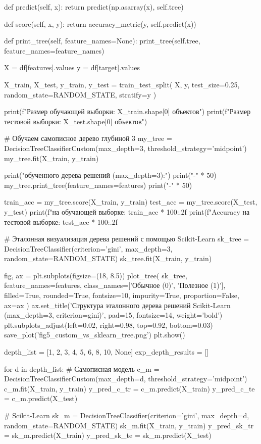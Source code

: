 \documentclass[14pt,a4paper]{extarticle}
\begin{document}
\begin{CodeListing}
    def predict(self, x):
        return predict(np.asarray(x), self.tree)

    def score(self, x, y):
        return accuracy_metric(y, self.predict(x))

    def print_tree(self, feature_names=None):
        print_tree(self.tree, feature_names=feature_names)

X = df[features].values
y = df[target].values

X_train, X_test, y_train, y_test = train_test_split(
    X, y, test_size=0.25, random_state=RANDOM_STATE, stratify=y
)

print(f"Размер обучающей выборки: {X_train.shape[0]} объектов")
print(f"Размер тестовой выборки:  {X_test.shape[0]} объектов")

# Обучаем самописное дерево глубиной 3
my_tree = DecisionTreeClassifierCustom(max_depth=3, threshold_strategy='midpoint')
my_tree.fit(X_train, y_train)

print(" обученного дерева решений (max_depth=3):")
print("-" * 50)
my_tree.print_tree(feature_names=features)
print("-" * 50)

train_acc = my_tree.score(X_train, y_train)
test_acc = my_tree.score(X_test, y_test)
print(f"\nAccuracy на обучающей выборке: {train_acc * 100:.2f}%
print(f"Accuracy на тестовой выборке:  {test_acc * 100:.2f}%

# Эталонная визуализация дерева решений с помощью Scikit-Learn
sk_tree = DecisionTreeClassifier(criterion='gini', max_depth=3, random_state=RANDOM_STATE)
sk_tree.fit(X_train, y_train)

fig, ax = plt.subplots(figsize=(18, 8.5))
plot_tree(
    sk_tree,
    feature_names=features,
    class_names=['Обычное (0)', 'Полезное (1)'],
    filled=True,
    rounded=True,
    fontsize=10,
    impurity=True,
    proportion=False,
    ax=ax
)
ax.set_title('Структура эталонного дерева решений Scikit-Learn (max_depth=3, criterion=gini)', pad=15, fontsize=14, weight='bold')
plt.subplots_adjust(left=0.02, right=0.98, top=0.92, bottom=0.03)
save_plot('fig5_custom_vs_sklearn_tree.png')
plt.show()

depth_list = [1, 2, 3, 4, 5, 6, 8, 10, None]
exp_depth_results = []

for d in depth_list:
    # Самописная модель
    c_m = DecisionTreeClassifierCustom(max_depth=d, threshold_strategy='midpoint')
    c_m.fit(X_train, y_train)
    y_pred_c_tr = c_m.predict(X_train)
    y_pred_c_te = c_m.predict(X_test)

    # Scikit-Learn
    sk_m = DecisionTreeClassifier(criterion='gini', max_depth=d, random_state=RANDOM_STATE)
    sk_m.fit(X_train, y_train)
    y_pred_sk_tr = sk_m.predict(X_train)
    y_pred_sk_te = sk_m.predict(X_test)


\end{CodeListing}
\end{document}

